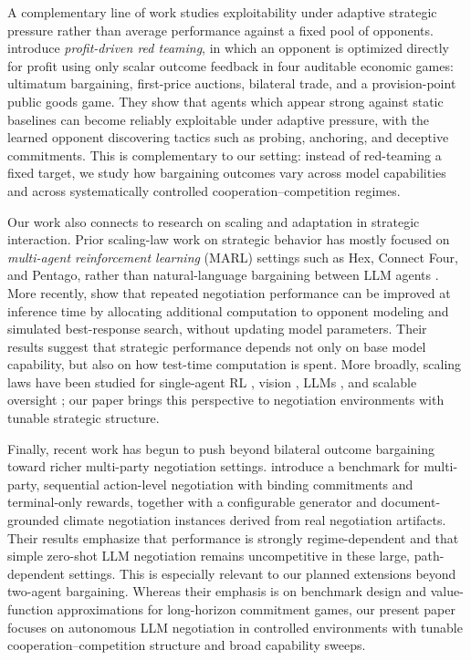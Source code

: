 A complementary line of work studies exploitability under adaptive strategic pressure rather than average performance against a fixed pool of opponents.
\citet{wang_profit_2026} introduce \emph{profit-driven red teaming}, in which an opponent is optimized directly for profit using only scalar outcome feedback in four auditable economic games: ultimatum bargaining, first-price auctions, bilateral trade, and a provision-point public goods game.
They show that agents which appear strong against static baselines can become reliably exploitable under adaptive pressure, with the learned opponent discovering tactics such as probing, anchoring, and deceptive commitments.
This is complementary to our setting: instead of red-teaming a fixed target, we study how bargaining outcomes vary across model capabilities and across systematically controlled cooperation--competition regimes.

Our work also connects to research on scaling and adaptation in strategic interaction.
Prior scaling-law work on strategic behavior has mostly focused on \emph{multi-agent reinforcement learning} (MARL) settings such as Hex, Connect Four, and Pentago, rather than natural-language bargaining between LLM agents \citep{jones_scaling_2021,neumann_scaling_2022}.
More recently, \citet{liu_scaling_2026} show that repeated negotiation performance can be improved at inference time by allocating additional computation to opponent modeling and simulated best-response search, without updating model parameters.
Their results suggest that strategic performance depends not only on base model capability, but also on how test-time computation is spent.
More broadly, scaling laws have been studied for single-agent RL \citep{hilton_scaling_2023}, vision \citep{Zhai2022}, LLMs \citep{hoffmann_training_2022,kaplan_scaling_2020}, and scalable oversight \citep{engels_scaling_2025}; our paper brings this perspective to negotiation environments with tunable strategic structure.

Finally, recent work has begun to push beyond bilateral outcome bargaining toward richer multi-party negotiation settings.
\citet{benac_benchmark_2026} introduce a benchmark for multi-party, sequential action-level negotiation with binding commitments and terminal-only rewards, together with a configurable generator and document-grounded climate negotiation instances derived from real negotiation artifacts.
Their results emphasize that performance is strongly regime-dependent and that simple zero-shot LLM negotiation remains uncompetitive in these large, path-dependent settings.
This is especially relevant to our planned extensions beyond two-agent bargaining.
Whereas their emphasis is on benchmark design and value-function approximations for long-horizon commitment games, our present paper focuses on autonomous LLM negotiation in controlled environments with tunable cooperation--competition structure and broad capability sweeps.

